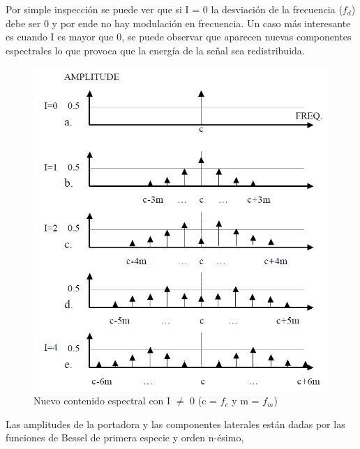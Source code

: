 \documentclass[assd_tp2_main.tex]{subfiles}
\begin{document}
Por simple inspección se puede ver que si I = 0 la desviación de la frecuencia ($f_d$) debe ser 0 y por ende no hay  modulación en frecuencia. Un caso más interesante es cuando I es mayor que 0, se puede observar que aparecen nuevas componentes espectrales lo que provoca que la energía de la señal sea redistribuida.  
\begin{figure}[H]
\centering
\includegraphics[width=0.4\linewidth]{graficos/EJ4/nuevasfreqs.png}
\caption{Nuevo contenido espectral con I $\neq$ 0 (c = $f_c$ y  m = $f_m$)}
\label{fig:nuevasfreqs}
\end{figure}
Las amplitudes de la portadora y las componentes laterales están dadas por las funciones de Bessel de primera especie y orden n-ésimo,
\end{document}
